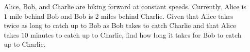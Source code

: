 Alice, Bob, and Charlie are biking forward at constant speeds. Currently, Alice is $1$ mile behind Bob and Bob is $2$ miles behind Charlie. Given that Alice takes twice as long to catch up to Bob as Bob takes to catch Charlie and that Alice takes $10$ minutes to catch up to Charlie, find how long it takes for Bob to catch up to Charlie.
